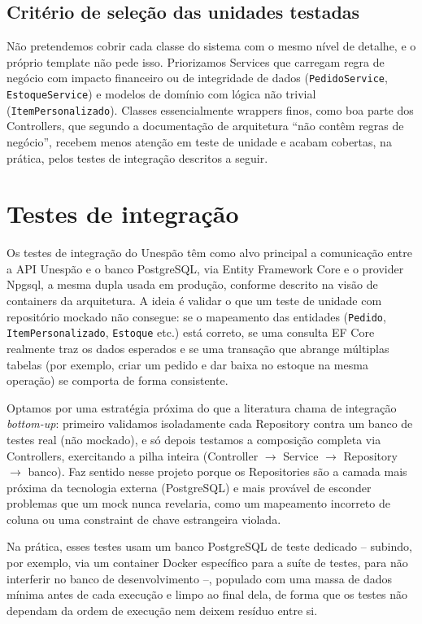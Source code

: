 \documentclass[a4paper,12pt,oneside,openany]{book}
\begin{document}
\subsection*{Critério de seleção das unidades testadas}

Não pretendemos cobrir cada classe do sistema com o mesmo nível de detalhe, e o próprio template não pede isso. Priorizamos Services que carregam regra de negócio com impacto financeiro ou de integridade de dados (\texttt{PedidoService}, \texttt{EstoqueService}) e modelos de domínio com lógica não trivial (\texttt{ItemPersonalizado}). Classes essencialmente wrappers finos, como boa parte dos Controllers, que segundo a documentação de arquitetura ``não contêm regras de negócio'', recebem menos atenção em teste de unidade e acabam cobertas, na prática, pelos testes de integração descritos a seguir.

\section{Testes de integração}

Os testes de integração do Unespão têm como alvo principal a comunicação entre a API Unespão e o banco PostgreSQL, via Entity Framework Core e o provider Npgsql, a mesma dupla usada em produção, conforme descrito na visão de containers da arquitetura. A ideia é validar o que um teste de unidade com repositório mockado não consegue: se o mapeamento das entidades (\texttt{Pedido}, \texttt{ItemPersonalizado}, \texttt{Estoque} etc.) está correto, se uma consulta EF Core realmente traz os dados esperados e se uma transação que abrange múltiplas tabelas (por exemplo, criar um pedido e dar baixa no estoque na mesma operação) se comporta de forma consistente.

Optamos por uma estratégia próxima do que a literatura chama de integração \textit{bottom-up}: primeiro validamos isoladamente cada Repository contra um banco de testes real (não mockado), e só depois testamos a composição completa via Controllers, exercitando a pilha inteira (Controller $\rightarrow$ Service $\rightarrow$ Repository $\rightarrow$ banco). Faz sentido nesse projeto porque os Repositories são a camada mais próxima da tecnologia externa (PostgreSQL) e mais provável de esconder problemas que um mock nunca revelaria, como um mapeamento incorreto de coluna ou uma constraint de chave estrangeira violada.

Na prática, esses testes usam um banco PostgreSQL de teste dedicado -- subindo, por exemplo, via um container Docker específico para a suíte de testes, para não interferir no banco de desenvolvimento --, populado com uma massa de dados mínima antes de cada execução e limpo ao final dela, de forma que os testes não dependam da ordem de execução nem deixem resíduo entre si.
\end{document}
